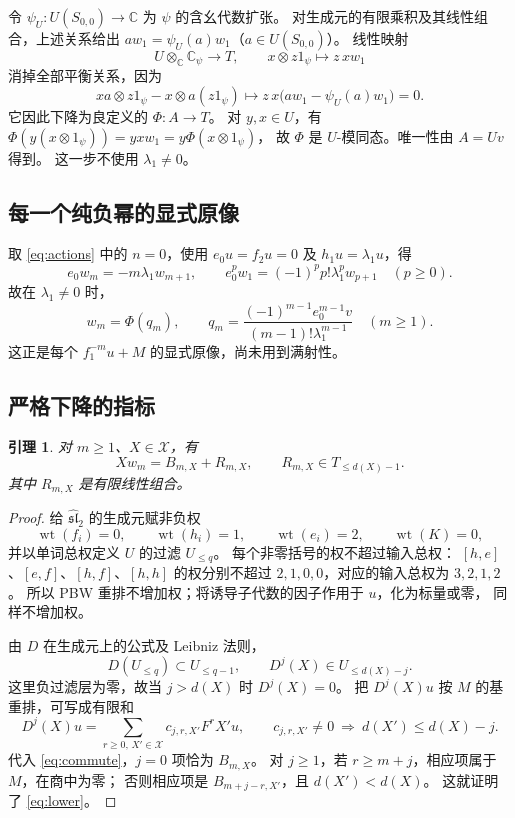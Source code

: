 \documentclass[UTF8,11pt]{ctexart}
\newcommand{\C}{\mathbb C}
\newcommand{\g}{\widehat{\mathfrak{sl}}_2}
\newcommand{\wt}{\operatorname{wt}}
\newtheorem{lemma}[theorem]{引理}
\theoremstyle{definition}
\begin{document}
令 \(\psi_U:U(S_{0,0})\to\C\) 为 \(\psi\) 的含幺代数扩张。
对生成元的有限乘积及其线性组合，上述关系给出
\(aw_1=\psi_U(a)w_1\)（\(a\in U(S_{0,0})\)）。
线性映射
\[
 U\otimes_\C\C_\psi\longrightarrow T,\qquad
 x\otimes z1_\psi\longmapsto z\,xw_1
\]
消掉全部平衡关系，因为
\[
 xa\otimes z1_\psi-x\otimes a(z1_\psi)
 \longmapsto z\,x\bigl(aw_1-\psi_U(a)w_1\bigr)=0.
\]
它因此下降为良定义的 \(\Phi:A\to T\)。
对 \(y,x\in U\)，有
\(\Phi(y(x\otimes1_\psi))=yxw_1=y\Phi(x\otimes1_\psi)\)，
故 \(\Phi\) 是 \(U\)-模同态。唯一性由 \(A=Uv\) 得到。
这一步不使用 \(\lambda_1\ne0\)。

\subsection{每一个纯负幂的显式原像}

取 \eqref{eq:actions} 中的 \(n=0\)，使用
\(e_0u=f_2u=0\) 及 \(h_1u=\lambda_1u\)，得
\begin{equation}\label{eq:tower}
 e_0w_m=-m\lambda_1w_{m+1},\qquad
 e_0^pw_1=(-1)^pp!\lambda_1^pw_{p+1}\quad(p\ge0).
\end{equation}
故在 \(\lambda_1\ne0\) 时，
\begin{equation}\label{eq:preimage}
 w_m=\Phi(q_m),\qquad
 q_m=\frac{(-1)^{m-1}e_0^{m-1}v}{(m-1)!\lambda_1^{m-1}}\quad(m\ge1).
\end{equation}
这正是每个 \(f_1^{-m}u+M\) 的显式原像，尚未用到满射性。

\subsection{严格下降的指标}

\begin{lemma}\label{lem:lower}
对 \(m\ge1\)、\(X\in\mathcal X\)，有
\begin{equation}\label{eq:lower}
 Xw_m=B_{m,X}+R_{m,X},\qquad
 R_{m,X}\in T_{\le d(X)-1}.
\end{equation}
其中 \(R_{m,X}\) 是有限线性组合。
\end{lemma}

\begin{proof}
给 \(\g\) 的生成元赋非负权
\[
 \wt(f_i)=0,\qquad \wt(h_i)=1,\qquad \wt(e_i)=2,\qquad \wt(K)=0,
\]
并以单词总权定义 \(U\) 的过滤 \(U_{\le q}\)。
每个非零括号的权不超过输入总权：
\([h,e]\)、\([e,f]\)、\([h,f]\)、\([h,h]\) 的权分别不超过
\(2,1,0,0\)，对应的输入总权为 \(3,2,1,2\)。
所以 PBW 重排不增加权；将诱导子代数的因子作用于 \(u\)，化为标量或零，
同样不增加权。

由 \(D\) 在生成元上的公式及 Leibniz 法则，
\[
 D(U_{\le q})\subset U_{\le q-1},\qquad
 D^j(X)\in U_{\le d(X)-j}.
\]
这里负过滤层为零，故当 \(j>d(X)\) 时 \(D^j(X)=0\)。
把 \(D^j(X)u\) 按 \(M\) 的基重排，可写成有限和
\[
 D^j(X)u=\sum_{r\ge0,\,X'\in\mathcal X}c_{j,r,X'}F^rX'u,
 \qquad c_{j,r,X'}\ne0\ \Longrightarrow\ d(X')\le d(X)-j.
\]
代入 \eqref{eq:commute}，\(j=0\) 项恰为 \(B_{m,X}\)。
对 \(j\ge1\)，若 \(r\ge m+j\)，相应项属于 \(M\)，在商中为零；
否则相应项是 \(B_{m+j-r,X'}\)，且 \(d(X')<d(X)\)。
这就证明了 \eqref{eq:lower}。
\end{proof}
\end{document}
